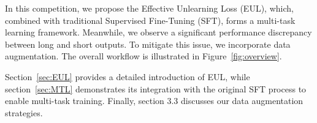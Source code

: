\documentclass[11pt]{article}
\begin{document}

In this competition, we propose the Effective Unlearning Loss (EUL), which, combined with traditional Supervised Fine-Tuning (SFT), forms a multi-task learning framework. Meanwhile, we observe a significant performance discrepancy between long and short outputs. To mitigate this issue, we incorporate data augmentation. The overall workflow is illustrated in Figure~\ref{fig:overview}.

Section~\ref{sec:EUL} provides a detailed introduction of EUL, while section~\ref{sec:MTL} demonstrates its integration with the original SFT process to enable multi-task training. Finally, section 3.3 discusses our data augmentation strategies.



\end{document}
